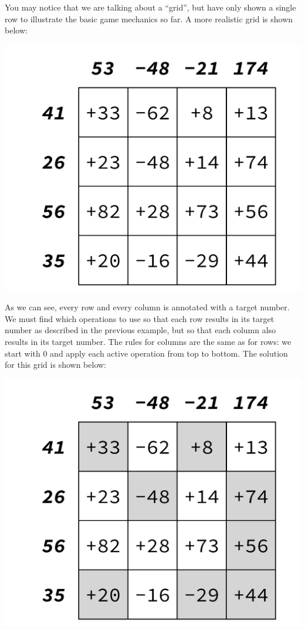 You may notice that we are talking about a ``grid'', but have only shown a single row to illustrate the basic game mechanics so far. A more realistic grid is shown below:
\begin{center}
	\includegraphics[scale=0.4,trim=0 30 0 30]{cswk/lac2.pdf}
\end{center}
As we can see, every row and every column is annotated with a target number. We must find which operations to use so that each row results in its target number as described in the previous example, but so that each column also results in its target number. The rules for columns are the same as for rows: we start with 0 and apply each active operation from top to bottom. The solution for this grid is shown below:
\begin{center}
	\includegraphics[scale=0.4,trim=0 30 0 30]{cswk/lac2c.pdf}
\end{center} 
